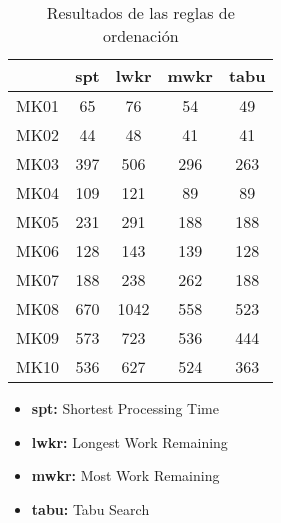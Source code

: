 \begin{table}[ht]
    \centering
    \begin{tabular}[ht]{|l|cccc|}
        \hline
                  & spt & lwkr & mwkr & tabu \\
        \hline
        MK01      & 65      & 76    & 54    & 49    \\
        MK02      & 44      & 48    & 41    & 41    \\
        MK03      & 397     & 506   & 296   & 263   \\
        MK04      & 109     & 121   & 89    & 89    \\
        MK05      & 231     & 291   & 188   & 188   \\
        MK06      & 128     & 143   & 139   & 128   \\
        MK07      & 188     & 238   & 262   & 188   \\
        MK08      & 670     & 1042  & 558   & 523   \\
        MK09      & 573     & 723   & 536   & 444   \\
        MK10      & 536     & 627   & 524   & 363   \\
        \hline
    \end{tabular}
    \caption{Resultados de las reglas de ordenación}
\end{table}

\begin{itemize}
    \item \textbf{spt:} Shortest Processing Time
    \item \textbf{lwkr:} Longest Work Remaining
    \item \textbf{mwkr:} Most Work Remaining
    \item \textbf{tabu:} Tabu Search
\end{itemize}
